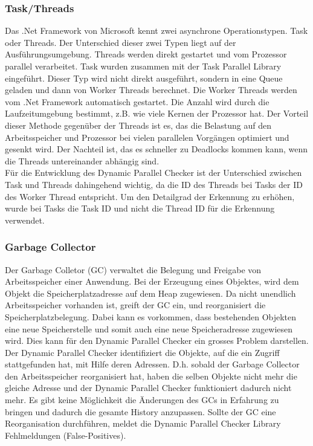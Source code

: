 \documentclass[10pt,a4paper]{article}
\begin{document}
\subsubsection{Task/Threads}\label{chapter_taskthread}
\begin{flushleft}
Das .Net Framework von Microsoft kennt zwei asynchrone Operationstypen. Task oder Threads. Der Unterschied dieser zwei Typen liegt auf der Ausführungsumgebung. Threads werden direkt gestartet und vom Prozessor parallel verarbeitet. Task wurden zusammen mit der Task Parallel Library eingeführt. Dieser Typ wird nicht direkt ausgeführt, sondern in eine Queue geladen und dann von Worker Threads berechnet. Die Worker Threads werden vom .Net Framework automatisch gestartet. Die Anzahl wird durch die Laufzeitumgebung bestimmt, z.B. wie viele Kernen der Prozessor hat. Der Vorteil dieser Methode gegenüber der Threads ist es, das die Belastung auf den Arbeitsspeicher und Prozessor bei vielen parallelen Vorgängen optimiert und gesenkt wird. Der Nachteil ist, das es schneller zu Deadlocks kommen kann, wenn die Threads untereinander abhängig sind.\\
Für die Entwicklung des Dynamic Parallel Checker ist der Unterschied zwischen Task und Threads dahingehend wichtig, da die ID des Threads bei Tasks der ID des Worker Thread entspricht. Um den Detailgrad der Erkennung zu erhöhen, wurde bei Tasks die Task ID und nicht die Thread ID für die Erkennung verwendet.
\end{flushleft}
\subsubsection{Garbage Collector}
\begin{flushleft}
Der Garbage Colletor (GC) verwaltet die Belegung und Freigabe von Arbeitsspeicher einer Anwendung. Bei der Erzeugung eines Objektes, wird dem Objekt die Speicherplatzadresse auf dem Heap zugewiesen. Da nicht unendlich Arbeitsspeicher vorhanden ist, greift der GC ein, und reorganisiert die Speicherplatzbelegung. Dabei kann es vorkommen, dass bestehenden Objekten eine neue Speicherstelle und somit auch eine neue Speicheradresse zugewiesen wird. Dies kann für den Dynamic Parallel Checker ein grosses Problem darstellen.\\
Der Dynamic Parallel Checker identifiziert die Objekte, auf die ein Zugriff stattgefunden hat, mit Hilfe deren Adressen. D.h. sobald der Garbage Collector den Arbeitsspeicher reorganisiert hat, haben die selben Objekte nicht mehr die gleiche Adresse und der Dynamic Parallel Checker funktioniert dadurch nicht mehr. Es gibt keine Möglichkeit die Änderungen des GCs in Erfahrung zu bringen und dadurch die gesamte History anzupassen. Sollte der GC eine Reorganisation durchführen, meldet die Dynamic Parallel Checker Library Fehlmeldungen (False-Positives).
\end{flushleft}
\end{document}
